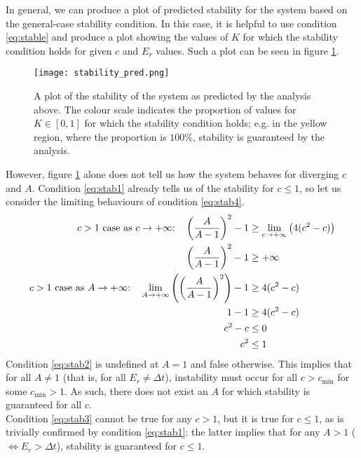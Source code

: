 \documentclass[11pt]{article}
\begin{document}
In general, we can produce a plot of predicted stability for the system based on the general-case stability condition. In this case, it is helpful to use condition \ref{eq:stable} and produce a plot showing the values of $K$ for which the stability condition holds for given $c$ and $E_r$ values. Such a plot can be seen in figure \ref{fig:stability_pred}.
\begin{figure}[H]
\centering
\texttt{[image: stability\_pred.png]}
\caption{A plot of the stability of the system as predicted by the analysis above. The colour scale indicates the proportion of values for $K\in[0,1]$ for which the stability condition holds; e.g. in the yellow region, where the proportion is $100\%$, stability is guaranteed by the analysis.}
\label{fig:stability_pred}
\end{figure}
However, figure \ref{fig:stability_pred} alone does not tell us how the system behaves for diverging $c$ and $A$. Condition \ref{eq:stab1} already tells us of the stability for $c\leq 1$, so let us consider the limiting behaviours of condition \ref{eq:stab4}.
\begin{align}
\text{$c>1$ case as $c\to +\infty$:\quad} \left(\frac{A}{A-1}\right)^2 -1 &\geq \lim_{c\to +\infty}\left(4(c^2-c)\right) \nonumber \\
\left(\frac{A}{A-1}\right)^2 -1 &\geq +\infty		\label{eq:stab2} \\
\text{$c>1$ case as $A\to +\infty$:\quad} \lim_{A\to +\infty}\left(\left(\frac{A}{A-1}\right)^2\right)-1 &\geq 4(c^2-c) \nonumber\\
1 - 1 &\geq 4(c^2-c) \nonumber\\
c^2-c &\leq 0 \nonumber\\
c^2 &\leq 1		\label{eq:stab3}
\end{align}
Condition \ref{eq:stab2} is undefined at $A=1$ and false otherwise. This implies that for all $A\neq 1$ (that is, for all $E_r\neq\Delta t$), instability must occur for all $c>c_{\text{min}}$ for some $c_{\text{min}}>1$. As such, there does not exist an $A$ for which stability is guaranteed for all $c$. \\
Condition \ref{eq:stab3} cannot be true for any $c>1$, but it is true for $c\leq 1$, as is trivially confirmed by condition \ref{eq:stab1}: the latter implies that for any $A>1$ ($\Leftrightarrow E_r>\Delta t$), stability is guaranteed for $c\leq 1$.
\end{document}
